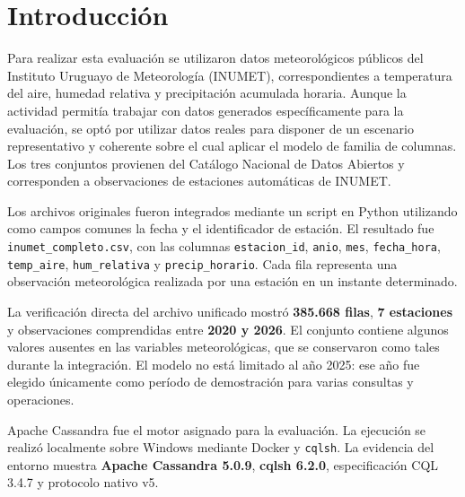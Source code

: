 \section*{Introducción}

Para realizar esta evaluación se utilizaron datos meteorológicos públicos del Instituto Uruguayo de Meteorología (INUMET), correspondientes a temperatura del aire, humedad relativa y precipitación acumulada horaria. Aunque la actividad permitía trabajar con datos generados específicamente para la evaluación, se optó por utilizar datos reales para disponer de un escenario representativo y coherente sobre el cual aplicar el modelo de familia de columnas. Los tres conjuntos provienen del Catálogo Nacional de Datos Abiertos y corresponden a observaciones de estaciones automáticas de INUMET. \parencite{inumet_temp,inumet_hum,inumet_precip}

Los archivos originales fueron integrados mediante un script en Python utilizando como campos comunes la fecha y el identificador de estación. El resultado fue \texttt{inumet\_completo.csv}, con las columnas \texttt{estacion\_id}, \texttt{anio}, \texttt{mes}, \texttt{fecha\_hora}, \texttt{temp\_aire}, \texttt{hum\_relativa} y \texttt{precip\_horario}. Cada fila representa una observación meteorológica realizada por una estación en un instante determinado.

La verificación directa del archivo unificado mostró \textbf{385.668 filas}, \textbf{7 estaciones} y observaciones comprendidas entre \textbf{2020 y 2026}. El conjunto contiene algunos valores ausentes en las variables meteorológicas, que se conservaron como tales durante la integración. El modelo no está limitado al año 2025: ese año fue elegido únicamente como período de demostración para varias consultas y operaciones.

Apache Cassandra fue el motor asignado para la evaluación. La ejecución se realizó localmente sobre Windows mediante Docker y \texttt{cqlsh}. La evidencia del entorno muestra \textbf{Apache Cassandra 5.0.9}, \textbf{cqlsh 6.2.0}, especificación CQL 3.4.7 y protocolo nativo v5.
